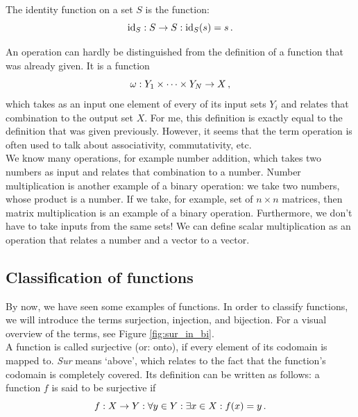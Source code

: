         The identity function on a set $S$ is the function:
        \begin{equation}
            \operatorname{id}_S: S \rightarrow S: \operatorname{id}_S(s) = s \thinspace .
        \end{equation}

        An operation can hardly be distinguished from the definition of a function that was already given. It is a function
        \begin{equation}
            \omega: Y_1 \times \cdots \times Y_N \rightarrow X \thinspace ,
        \end{equation}
        which takes as an input one element of every of its input sets $Y_i$ and relates that combination to the output set $X$. For me, this definition is exactly equal to the definition that was given previously. However, it seems that the term operation is often used to talk about associativity, commutativity, etc. \\

        We know many operations, for example number addition, which takes two numbers as input and relates that combination to a number. Number multiplication is another example of a binary operation: we take two numbers, whose product is a number. If we take, for example, set of $n \times n$ matrices, then matrix multiplication is an example of a binary operation. Furthermore, we don't have to take inputs from the same sets! We can define scalar multiplication as an operation that relates a number and a vector to a vector. \\

    \subsection{Classification of functions}
        By now, we have seen some examples of functions. In order to classify functions, we will introduce the terms surjection, injection, and bijection. For a visual overview of the terms, see Figure \ref{fig:sur_in_bi}. \\

        A function is called surjective (or: onto), if every element of its codomain is mapped to. \emph{Sur} means `above', which relates to the fact that the function's codomain is completely covered. Its definition can be written as follows: a function $f$ is said to be surjective if
        \begin{equation}
            f: X \rightarrow Y: \forall y \in Y: \exists x \in X: f(x) = y \thinspace .
        \end{equation}

